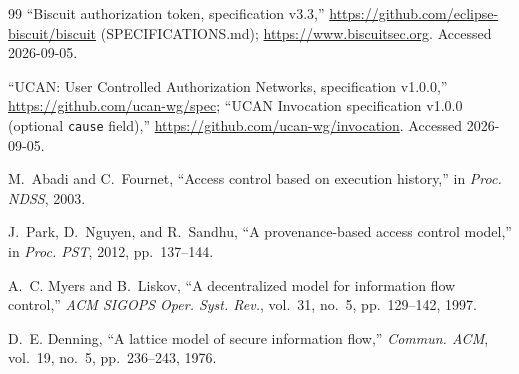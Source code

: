\documentclass[conference]{IEEEtran}
\begin{document}
\begin{thebibliography}{99}
 ``Biscuit authorization token, specification v3.3,'' \url{https://github.com/eclipse-biscuit/biscuit} (SPECIFICATIONS.md); \url{https://www.biscuitsec.org}. Accessed 2026-09-05.

 ``UCAN: User Controlled Authorization Networks, specification v1.0.0,'' \url{https://github.com/ucan-wg/spec}; ``UCAN Invocation specification v1.0.0 (optional \texttt{cause} field),'' \url{https://github.com/ucan-wg/invocation}. Accessed 2026-09-05.

 M.~Abadi and C.~Fournet, ``Access control based on execution history,'' in \emph{Proc. NDSS}, 2003.

 J.~Park, D.~Nguyen, and R.~Sandhu, ``A provenance-based access control model,'' in \emph{Proc. PST}, 2012, pp.~137--144.

 A.~C. Myers and B.~Liskov, ``A decentralized model for information flow control,'' \emph{ACM SIGOPS Oper. Syst. Rev.}, vol.~31, no.~5, pp.~129--142, 1997.

 D.~E. Denning, ``A lattice model of secure information flow,'' \emph{Commun. ACM}, vol.~19, no.~5, pp.~236--243, 1976.

\end{thebibliography}
\end{document}
